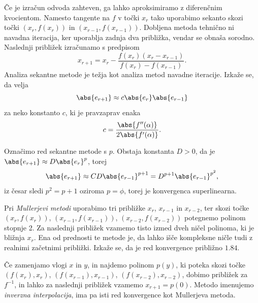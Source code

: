 

Če je izračun odvoda zahteven, ga lahko aproksimiramo z diferenčnim kvocientom.
Namesto tangente na $f$ v točki $x_r$ tako uporabimo sekanto skozi točki $(x_r,
f(x_r))$ in $(x_{r-1}, f(x_{r-1}))$.
Dobljena metoda tehnično ni navadna iteracija, ker uporablja zadnja dva
približka, vendar se obnaša sorodno.
Naslednji približek izračunamo s predpisom
\[
  x_{r+1} = x_r - \frac{f(x_r) (x_r - x_{r-1})}{f(x_r) - f(x_{r-1})}.
\]
Analiza sekantne metode je težja kot analiza metod navadne iteracije.
Izkaže se, da velja
\[
  \abs{e_{r+1}} \approx c \abs{e_r} \abs{e_{r-1}}
\]
za neko konstanto $c$, ki je pravzaprav enaka
\[
  c = \frac{\abs{f''(\alpha)}}{2 \abs{f'(\alpha)}}.
\]

Označimo red sekantne metode s $p$.
Obstaja konstanta $D > 0$, da je $\abs{e_{r+1}} \approx D \abs{e_r}^p$,
torej
\[
  \abs{e_{r+1}} \approx C D \abs{e_{r-1}}^{p+1} = D^{p+1} \abs{e_{r-1}}^{p^2},
\]
iz česar sledi $p^2 = p+1$ oziroma $p = \phi$, torej je konvergenca
superlinearna.



Pri \emph{Mullerjevi metodi} uporabimo tri približke $x_r$, $x_{r-1}$ in
$x_{r-2}$, ter skozi točke $(x_r, f(x_r))$, $(x_{r-1}, f(x_{r-1}))$, $(x_{r-2},
f(x_{r-2}))$ potegnemo polinom stopnje 2.
Za naslednji približek vzamemo tisto izmed dveh ničel polinoma, ki je bližnja
$x_r$.
Ena od prednosti te metode je, da lahko išče kompleksne ničle tudi z realnimi
začetnimi približki.
Izkaže se, da je red konvergence približno $1.84$.


Če zamenjamo vlogi $x$ in $y$, in najdemo polinom $p(y)$, ki poteka skozi točke
$(f(x_r), x_r)$, $(f(x_{r-1}), x_{r-1})$, $(f(x_{r-2}), x_{r-2})$, dobimo približek
za $f^{-1}$, in lahko za naslednji približek vzamemo $x_{r+1} = p(0)$.
Metodo imenujemo \emph{inverzna interpolacija}, ima pa isti red konvergence kot
Mullerjeva metoda.



